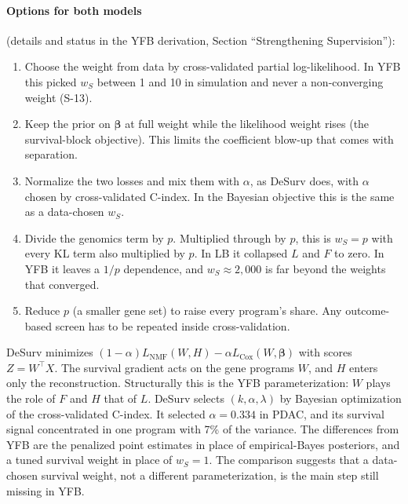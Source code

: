 \documentclass[11pt]{article}
\newcommand{\ws}{w_S}
\begin{document}
\paragraph{Options for both models} (details and status in the YFB derivation,
Section ``Strengthening Supervision''):
\begin{enumerate}
  \item Choose the weight from data by cross-validated partial
        log-likelihood. In YFB this picked $\ws$ between 1 and 10 in simulation
        and never a non-converging weight (S-13).
  \item Keep the prior on $\bm\beta$ at full weight while the likelihood weight
        rises (the survival-block objective). This limits the coefficient
        blow-up that comes with separation.
  \item Normalize the two losses and mix them with $\alpha$, as DeSurv does, with
        $\alpha$ chosen by cross-validated C-index. In the Bayesian objective
        this is the same as a data-chosen $\ws$.
  \item Divide the genomics term by $p$. Multiplied through by $p$, this is
        $\ws = p$ with every KL term also multiplied by $p$. In LB it collapsed $L$
        and $F$ to zero. In YFB it leaves a $1/p$ dependence, and $\ws\approx 2{,}000$
        is far beyond the weights that converged.
  \item Reduce $p$ (a smaller gene set) to raise every program's share. Any
        outcome-based screen has to be repeated inside cross-validation.
\end{enumerate}

\begin{keybox}
DeSurv minimizes $(1-\alpha)L_{\text{NMF}}(W,H) - \alpha L_{\text{Cox}}(W,\bm\beta)$
with scores $Z = W^\top X$. The survival gradient acts on the gene programs $W$,
and $H$ enters only the reconstruction. Structurally this is the YFB
parameterization: $W$ plays the role of $F$ and $H$ that of $L$. DeSurv selects
$(k,\alpha,\lambda)$ by Bayesian optimization of the cross-validated C-index. It
selected $\alpha = 0.334$ in PDAC, and its survival signal concentrated in one
program with 7\% of the variance. The differences from YFB are the penalized
point estimates in place of empirical-Bayes posteriors, and a tuned survival
weight in place of $\ws = 1$. The comparison suggests that a data-chosen
survival weight, not a different parameterization, is the main step still
missing in YFB.
\end{keybox}
\end{document}
